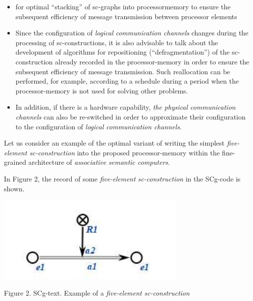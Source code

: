 \documentclass{article}
\begin{document}
{\selectfont
\begin{multicols}{2}

\setcounter{page}{57}

\begin{itemize}
\item[] for optimal “stacking” of sc-graphs into processormemory to ensure the subsequent efficiency of
message transmission between processor elements


\item Since the configuration of \textit{logical communication
channels} changes during the processing of sc-constructions, it is also advisable to talk about
the development of algorithms for repositioning
(“defragmentation”) of the sc-construction already
recorded in the processor-memory in order to ensure
the subsequent efficiency of message transmission.
Such reallocation can be performed, for example,
according to a schedule during a period when the
processor-memory is not used for solving other
problems.

\item In addition, if there is a hardware capability, \textit{the physical communication channels} can also be re-switched
in order to approximate their configuration to the
configuration of \textit{logical communication channels}.
\end{itemize}

Let us consider an example of the optimal variant
of writing the simplest \textit{five-element sc-construction} into
the proposed processor-memory within the fine-grained
architecture of \textit{associative semantic computers}.

In Figure 2, the record of some \textit{five-element sc-construction} in the SCg-code is shown.

\begin{center}
    \includegraphics[scale=0.5]{images/aboa.png}
    
    \vspace{+6pt}
    {\small Figure 2. SCg-text. Example of a \textit{five-element sc-construction}}
\end{center}



\end{multicols}}
\end{document}
